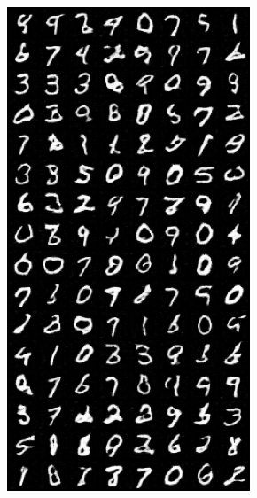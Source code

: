 \begin{figure}[!htbp]
    \centering

    \begin{subfigure}{0.2\textwidth}
        \centering
        \includegraphics[width=0.95\linewidth]{longer_epochs/fake_sample_epoch_0010.png}
        \caption{}
        \label{subfig:longer_epochs/fake_sample_epoch_0010}

\end{subfigure}
\end{figure}
